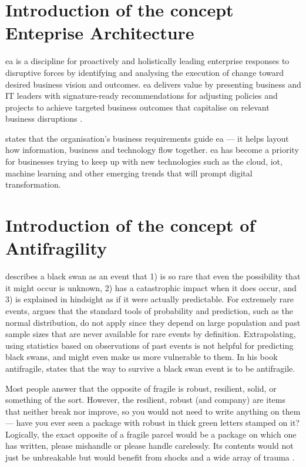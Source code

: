\section{Introduction of the concept Enteprise Architecture}
\label{introea}
\acrfull{ea} is a discipline for proactively and holistically leading enterprise responses to disruptive forces by identifying and analysing the execution of change toward desired business vision and outcomes. \acrshort{ea} delivers value by presenting business and IT leaders with signature-ready recommendations for adjusting policies and projects to achieve targeted business outcomes that capitalise on relevant business disruptions \parencite{Gartner}.\par
\textcite{White2018} states that the organisation’s business requirements guide \acrshort{ea} — it helps layout how information, business and technology flow together. \acrshort{ea} has become a priority for businesses trying to keep up with new technologies such as the cloud, \acrfull{iot}, machine learning and other emerging trends that will prompt digital transformation.

\section{Introduction of the concept of Antifragility}
\label{sec:introantifragility}
\textcite{Taleb2008} describes a black swan as an event that 1) is so rare that even the possibility that it might occur is unknown, 2) has a catastrophic impact when it does occur, and 3) is explained in hindsight as if it were actually predictable. For extremely rare events, \citeauthor{Taleb2008} argues that the standard tools of probability and prediction, such as the normal distribution, do not apply since they depend on large population and past sample sizes that are never available for rare events by definition. Extrapolating, using statistics based on observations of past events is not helpful for predicting black swans, and might even make us more vulnerable to them. In his book \Gls{antifragile}, \textcite{Taleb2013} states that the way to survive a black swan event is to be \gls{antifragile}.\par
Most people answer that the opposite of \gls{fragile} is \gls{robust}, \gls{resilient}, solid, or something of the sort. However, the \gls{resilient}, \gls{robust} (and company) are items that neither break nor improve, so you would not need to write anything on them — have you ever seen a package with \gls{robust} in thick green letters stamped on it? Logically, the exact opposite of a \gls{fragile} parcel would be a package on which one has written, please mishandle or please handle carelessly. Its contents would not just be unbreakable but would benefit from shocks and a wide array of trauma \parencite{Taleb2013}.


